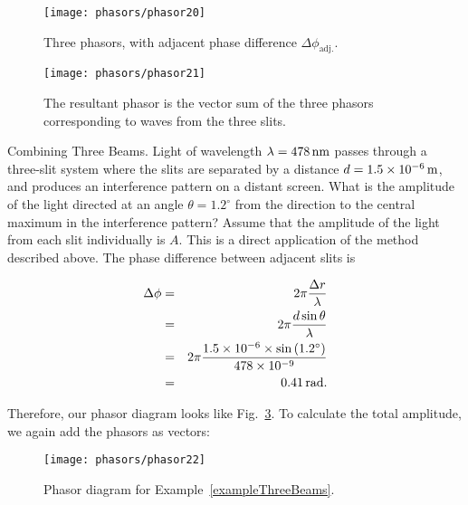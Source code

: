 \begin{figure}
\begin{center}
 \texttt{[image: phasors/phasor20]} 
\caption{\label{fig:phasor20}Three phasors, with adjacent phase difference
$\Delta\phi_\text{adj.}$.}
\end{center}
\end{figure}

\begin{figure}
\begin{center}
 \texttt{[image: phasors/phasor21]} 
\caption{\label{fig:phasor21}The resultant phasor is the vector sum of the
three phasors corresponding to waves from the three slits.}
\end{center}
\end{figure}

\begin{example}{Combining Three Beams.} 
\label{exampleThreeBeams}
Light of wavelength $\lambda = 478\,\mbox{nm}$ passes
through a three-slit system where the slits are separated by a
distance $d = 1.5 \times 10^{-6}\,\mbox{m}$, and produces an
interference pattern on a distant screen. What is the amplitude of the
light directed at an angle $\theta = 1.2^\circ$ from the direction to
the central maximum in the interference pattern? Assume that the
amplitude of the light from each slit individually is $A$.
\solution
This is a direct application of the method described above. The phase
difference between adjacent slits is

\begin{eqnarray*}
\Delta \phi & = & 2\pi \frac{\Delta r}{\lambda}\\
            & = & 2\pi \frac{d\sin{\theta}}{\lambda} \\
            & = & 2\pi \frac{1.5 \times 10^{-6}\times \sin{(1.2^\circ)}}
            {478 \times 10^{-9}} \\
            & = & 0.41\,\mbox{rad}.\\
\end{eqnarray*}

Therefore, our phasor diagram looks like Fig.~\ref{fig:phasor22}.
To calculate the total amplitude, we again add the phasors as vectors:

\begin{figure}[b]
\begin{center}
 \texttt{[image: phasors/phasor22]} 
\caption{\label{fig:phasor22}Phasor diagram for Example~\ref{exampleThreeBeams}.}
\end{center}
\end{figure}



\end{example}
